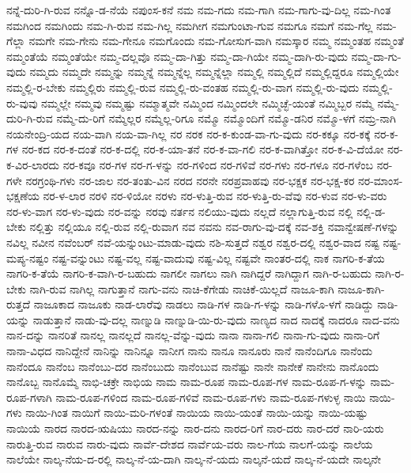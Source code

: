 {ನನ್ನೆ-ದುರಿ-ಗಿ-ರುವ
ನನ್ನೊ-ಡ-ನೆಯೆ
ನಪುಂಸ-ಕನೆ
ನಮ
ನಮ-ಗದು
ನಮ-ಗಾಗಿ
ನಮ-ಗಾಗು-ವು-ದಿಲ್ಲ
ನಮ-ಗಿಂತ
ನಮಗಿಂದ
ನಮಗಿಂದು
ನಮ-ಗಿ-ರುವ
ನಮ-ಗಿಲ್ಲ
ನಮಗೀಗ
ನಮಗುಂಟಾ-ಗುವ
ನಮಗೂ
ನಮಗೆ
ನಮ-ಗೆಲ್ಲ
ನಮ-ಗೆಲ್ಲಾ
ನಮಗೇ
ನಮ-ಗೇನು
ನಮ-ಗೇನೂ
ನಮಗೊಂದು
ನಮ-ಗೋಸುಗ-ವಾಗಿ
ನಮಸ್ಕಾರ
ನಮ್ಮ
ನಮ್ಮಂತಹ
ನಮ್ಮಂತೆ
ನಮ್ಮಂತೆಯೆ
ನಮ್ಮಂತೆಯೇ
ನಮ್ಮ-ದಲ್ಲವೊ
ನಮ್ಮ-ದಾ-ಗಿತ್ತು
ನಮ್ಮ-ದಾ-ಗಿಯೇ
ನಮ್ಮ-ದಾಗಿ-ರು-ವುದು
ನಮ್ಮ-ದಾ-ಗು-ವುದು
ನಮ್ಮದು
ನಮ್ಮದೇ
ನಮ್ಮನ್ನು
ನಮ್ಮನ್ನೆ
ನಮ್ಮನ್ನೆಲ್ಲ
ನಮ್ಮನ್ನೆಲ್ಲಾ
ನಮ್ಮಲ್ಲಿ
ನಮ್ಮಲ್ಲಿದೆ
ನಮ್ಮಲ್ಲಿದ್ದರೂ
ನಮ್ಮಲ್ಲಿಯೇ
ನಮ್ಮಲ್ಲಿ-ರ-ಬೇಕು
ನಮ್ಮಲ್ಲಿರು
ನಮ್ಮಲ್ಲಿ-ರುವ
ನಮ್ಮಲ್ಲಿ-ರು-ವಂತಹ
ನಮ್ಮಲ್ಲಿ-ರು-ವಾಗ
ನಮ್ಮಲ್ಲಿ-ರು-ವುದು
ನಮ್ಮಲ್ಲಿ-ರು-ವುವು
ನಮ್ಮಲ್ಲೇ
ನಮ್ಮವು
ನಮ್ಮಷ್ಟು
ನಮ್ಮಾತ್ಮವೇ
ನಮ್ಮಿಂದ
ನಮ್ಮಿಂದಲೇ
ನಮ್ಮಿಚ್ಛೆ-ಯಂತೆ
ನಮ್ಮಿಬ್ಬರ
ನಮ್ಮೆ
ನಮ್ಮೆ-ದುರಿ-ಗಿ-ರುವ
ನಮ್ಮೆ-ದು-ರಿಗೆ
ನಮ್ಮೆಲ್ಲರ
ನಮ್ಮೆಲ್ಲ-ರಿಗೂ
ನಮ್ಮೊ
ನಮ್ಮೊಂದಿಗೆ
ನಮ್ಮೊ-ಡನಿರ
ನಮ್ಮೊ-ಳಗೆ
ನಮ್ರ-ನಾಗಿ
ನಯನೇಂದ್ರಿ-ಯದ
ನಯ-ವಾಗಿ
ನಯ-ವಾ-ಗಿಲ್ಲ
ನರ
ನರಕ
ನರ-ಕ-ಕುಂಡ-ವಾ-ಗು-ವುದು
ನರ-ಕಕ್ಕೂ
ನರ-ಕಕ್ಕೆ
ನರ-ಕ-ಗಳ
ನರ-ಕದ
ನರ-ಕ-ದಂತೆ
ನರ-ಕ-ದಲ್ಲಿ
ನರ-ಕ-ಯಾ-ತನೆ
ನರ-ಕ-ವಾ-ಗಲಿ
ನರ-ಕ-ವಾಗಿತ್ತೋ
ನರ-ಕ-ವಿ-ದೆಯೋ
ನರ-ಕ-ವಿರ-ಲಾರದು
ನರ-ಕವೂ
ನರ-ಗಳ
ನರ-ಗ-ಳನ್ನು
ನರ-ಗಳಿಂದ
ನರ-ಗಳಿವೆ
ನರ-ಗಳು
ನರ-ಗಳೂ
ನರ-ಗಳೆಂಬ
ನರ-ಗಳೇ
ನರಗ್ರಂಥಿ-ಗಳು
ನರ-ಜಾಲ
ನರ-ತಂತು-ವಿನ
ನರದ
ನರನೇ
ನರಪ್ರವಾಹವು
ನರ-ಭಕ್ಷಕ
ನರ-ಭಕ್ಷ-ಕರ
ನರ-ಮಾಂಸ-ಭಕ್ಷಣೆಯ
ನರ-ಳ-ಲಾರ
ನರಳಿ
ನರ-ಳಿಯೋ
ನರಳು
ನರ-ಳುತ್ತಿ-ರುವ
ನರ-ಳುತ್ತಿ-ರು-ವೆವು
ನರ-ಳುವ
ನರ-ಳು-ವರು
ನರ-ಳು-ವಾಗ
ನರ-ಳು-ವುದು
ನರ-ವನ್ನು
ನರವು
ನರ್ತನ
ನಲಿಯು-ವುದು
ನಲ್ಲದೆ
ನಲ್ಲಾಗುತ್ತಿ-ರುವ
ನಲ್ಲಿ
ನಲ್ಲಿ-ಡ-ಬೇಕು
ನಲ್ಲಿತ್ತು
ನಲ್ಲಿಯೂ
ನಲ್ಲಿ-ರುವ
ನಲ್ಲಿ-ರುವಾಗ
ನವ
ನವನು
ನವ-ರಾಗು-ವು-ದಕ್ಕೆ
ನವ-ಶಕ್ತಿ
ನವಾನ್ವೇಷಣೆ-ಗಳನ್ನು
ನವಿಲ್ಲ
ನವೀನ
ನವೆಂಬರ್
ನವೆ-ಯನ್ನುಂಟು-ಮಾಡು-ವುದು
ನಶಿ-ಸುತ್ತದೆ
ನಶ್ವರ
ನಶ್ವರ-ದಲ್ಲಿ
ನಶ್ವರ-ವಾದ
ನಷ್ಟ
ನಷ್ಟ-ಮಪ್ಯ-ನಷ್ಟಂ
ನಷ್ಟ-ವನ್ನುಂಟು
ನಷ್ಟ-ವಲ್ಲ
ನಷ್ಟ-ವಾದುವು
ನಷ್ಟ-ವಿಲ್ಲ
ನಷ್ಟವೇ
ನಾಂತರ-ದಲ್ಲಿ
ನಾಕ
ನಾಗರಿ-ಕ-ತೆಯ
ನಾಗರಿ-ಕ-ತೆಯೆ
ನಾಗರಿ-ಕ-ವಾಗಿ-ರ-ಬಹುದು
ನಾಗಲೀ
ನಾಗಲು
ನಾಗಿ
ನಾಗಿದ್ದರೆ
ನಾಗಿದ್ದಾಗ
ನಾಗಿ-ರ-ಬಹುದು
ನಾಗಿ-ರ-ಬೇಕು
ನಾಗಿ-ರುವ
ನಾಗಿಲ್ಲ
ನಾಗುತ್ತಾನೆ
ನಾಗು-ವನು
ನಾಚಿ-ಕೆಗೇಡು
ನಾಚಿಕೆ-ಯಿಲ್ಲದೆ
ನಾಜೂ-ಕಾಗಿ
ನಾಜೂ-ಕಾಗಿ-ರುತ್ತದೆ
ನಾಜೂಕಾದ
ನಾಜೂಕು
ನಾಡ-ಲಾರೆವು
ನಾಡಲು
ನಾಡಿ-ಗಳ
ನಾಡಿ-ಗ-ಳನ್ನು
ನಾಡಿ-ಗಳೊ-ಳಗೆ
ನಾಡಿದ್ದು
ನಾಡಿ-ಯನ್ನು
ನಾಡುತ್ತಾನೆ
ನಾಡು-ವು-ದಲ್ಲ
ನಾಣ್ನುಡಿ
ನಾಣ್ನುಡಿ-ಯಿ-ರು-ವುದು
ನಾಣ್ಯದ
ನಾದ
ನಾದಕ್ಕೆ
ನಾದರೂ
ನಾದ-ವನು
ನಾನ-ದನ್ನು
ನಾನರಿತೆ
ನಾನಲ್ಲ
ನಾನಲ್ಲದೆ
ನಾನಲ್ಲ-ವೆನ್ನು-ವುದು
ನಾನಾ
ನಾನಾ-ಗಲಿ
ನಾನಾ-ಗು-ವುದು
ನಾನಾ-ರಿಗೆ
ನಾನಾ-ವಿಧದ
ನಾನಿದ್ದೇನೆ
ನಾನಿನ್ನು
ನಾನಿನ್ನೂ
ನಾನೀಗ
ನಾನು
ನಾನೂ
ನಾನೂರು
ನಾನೆ
ನಾನೆಂದಿಗೂ
ನಾನೆಂದು
ನಾನೆಂದೂ
ನಾನೆಂಬ
ನಾನೆಂಬು-ದರ
ನಾನೆಂಬುದು
ನಾನೆಂಬುವ
ನಾನೆಷ್ಟು
ನಾನೇ
ನಾನೇಕೆ
ನಾನೇನು
ನಾನೊಂದು
ನಾನೊಬ್ಬ
ನಾನೊಮ್ಮೆ
ನಾಭಿ-ಚಕ್ರೇ
ನಾಭಿಯ
ನಾಮ
ನಾಮ-ರೂಪ
ನಾಮ-ರೂಪ-ಗಳ
ನಾಮ-ರೂಪ-ಗ-ಳನ್ನು
ನಾಮ-ರೂಪ-ಗಳಾಗಿ
ನಾಮ-ರೂಪ-ಗಳಿಂದ
ನಾಮ-ರೂಪ-ಗಳಿವೆ
ನಾಮ-ರೂಪ-ಗಳು
ನಾಮ-ರೂಪ-ಗಳುಳ್ಳ
ನಾಯಿ
ನಾಯಿ-ಗಳು
ನಾಯಿ-ಗಿಂತ
ನಾಯಿಗೆ
ನಾಯಿ-ಮರಿ-ಗಳಂತೆ
ನಾಯಿಯ
ನಾಯಿ-ಯಂತೆ
ನಾಯಿ-ಯನ್ನು
ನಾಯಿ-ಯಷ್ಟು
ನಾಯಿಯೆ
ನಾರದ
ನಾರದ-ಋಷಿಯು
ನಾರದ-ನನ್ನು
ನಾರ-ದನು
ನಾರದ-ರಿಗೆ
ನಾರ-ದರು
ನಾರ-ದರೆ
ನಾರಿ-ಯರು
ನಾರುತ್ತಿ-ರುವ
ನಾರುವ
ನಾರು-ವುದು
ನಾರ್ವೆ-ದೇಶದ
ನಾರ್ವೆಯ-ವರು
ನಾಲ-ಗೆಯ
ನಾಲಗೆ-ಯನ್ನು
ನಾಲೆಯ
ನಾಲೆಯೇ
ನಾಲ್ಕ-ನೆಯ-ದ-ರಲ್ಲಿ
ನಾಲ್ಕ-ನೆ-ಯ-ದಾಗಿ
ನಾಲ್ಕ-ನೆ-ಯದು
ನಾಲ್ಕನೆ-ಯದೆ
ನಾಲ್ಕ-ನೆ-ಯದೇ
ನಾಲ್ಕನೇ
}
